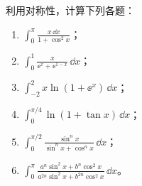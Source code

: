 \begin{xexercise}[3]
利用对称性，计算下列各题：
\begin{enumerate}[label=(\arabic*)]
  \item $\displaystyle\int_0^\pi\frac{x\,\dd x}{1+\cos^2x}$；
  \item $\displaystyle\int_0^1\frac{x}{\ee^x+\ee^{1-x}}\,\dd x$；
  \item $\displaystyle\int_{-2}^2x\ln(1+\ee^x)\,\dd x$；
  \item $\displaystyle\int_0^{\pi/4}\ln(1+\tan x)\,\dd x$；
  \item $\displaystyle\int_0^{\pi/2}\frac{\sin^n x}{\sin^n x+\cos^n x}\,\dd x$；
  \item $\displaystyle\int_0^\pi\frac{a^n\sin^2x+b^n\cos^2x}{a^{2n}\sin^2x+b^{2n}\cos^2x}\,\dd x$。
\end{enumerate}
\end{xexercise}
